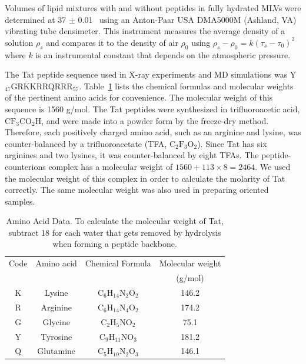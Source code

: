Volumes of lipid mixtures with and without peptides in fully hydrated 
MLVs were determined at 37 $\pm$ 0.01 \textcelsius\ 
using an Anton-Paar USA DMA5000M (Ashland, VA) vibrating tube densimeter. 
This instrument measures the average density of a solution $\rho_s$
and compares it to
the density of air $\rho_0$ using $\rho_s-\rho_0=k(\tau_s-\tau_0)^2$ where $k$ is
an instrumental constant that depends on the atmospheric pressure. 

The Tat peptide sequence used in X-ray experiments and MD simulations was 
Y$_{47}$GRKKRRQRRR$_{57}$. Table~\ref{tab:aa} lists the chemical formulas and 
molecular weights of the pertinent amino acids for convenience. 
The molecular weight of this sequence is 1560 g/mol.
The Tat peptides were synthesized in trifluoroacetic acid, $\mathrm{CF_3CO_2H}$, 
and were made into a powder form by the 
freeze-dry method. Therefore, each positively charged amino acid, such as 
an arginine and lysine, was counter-balanced by a trifluoroacetate (TFA, 
$\mathrm{C_2F_3O_2}$). Since Tat has six arginines and two lysines, 
it was counter-balanced by eight TFAs. 
The peptide-counterions complex has a molecular weight of 
$1560+113\times 8=2464$. We used the 
molecular weight of this complex in order to calculate the molarity of Tat
correctly. The same molecular weight was also used in preparing oriented 
samples.

\begin{table}[htbp]
  \centering
  \begin{tabular}{c c c c}
    \hline
    Code & Amino acid & Chemical Formula & Molecular weight \\
    & & & (g/mol) \\
    \hline
    K & Lysine & $\mathrm{C_6H_{14}N_2O_2}$ & 146.2 \\
    R & Arginine & $\mathrm{C_6H_{14}N_4O_2}$ & 174.2 \\
    G & Glycine & $\mathrm{C_2H_5NO_2}$ & 75.1\\
    Y & Tyrosine & $\mathrm{C_9H_{11}NO_3}$ & 181.2 \\
    Q & Glutamine & $\mathrm{C_5H_{10}N_2O_3}$ & 146.1 \\ 
    \hline
  \end{tabular}
  \caption[Amino acid data]
  {Amino Acid Data. To calculate the molecular weight of Tat,
  subtract 18 for each water that gets removed by hydrolysis when
  forming a peptide backbone.}
  \label{tab:aa}
\end{table}

